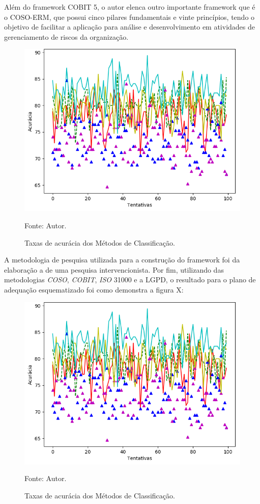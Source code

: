 \documentclass[
	12pt,				%
	openright,			%
	oneside,			%
	a4paper,			%
	english,			%
	french,				%
	spanish,			%
	brazil,				%
	]{abntex2}
\begin{document}
Além do framework COBIT 5, o autor elenca outro importante framework que é o COSO-ERM, que possui cinco pilares fundamentais e vinte princípios, tendo o objetivo de facilitar a aplicação para análise e desenvolvimento em atividades de gerenciamento de riscos da organização.

\begin{figure}[ht]
    \centering
    \caption{Taxas de acurácia dos Métodos de Classificação.}
    \includegraphics[width=5.0in]{Images/acc-classification.png}
    \label{fig: grafico-acc}
    
    \centering \small Fonte: Autor.
\end{figure}


A metodologia de pesquisa utilizada para a construção do framework foi da elaboração a de uma pesquisa intervencionista. Por fim, utilizando das metodologias \textit{COSO}, \textit{COBIT}, \textit{ISO} 31000 e a LGPD, o resultado para o plano de adequação esquematizado foi como demonstra a figura X: 


\begin{figure}[ht]
    \centering
    \caption{Taxas de acurácia dos Métodos de Classificação.}
    \includegraphics[width=5.0in]{Images/acc-classification.png}
    \label{fig: grafico-acc}
    
    \centering \small Fonte: Autor.
\end{figure}
\end{document}
